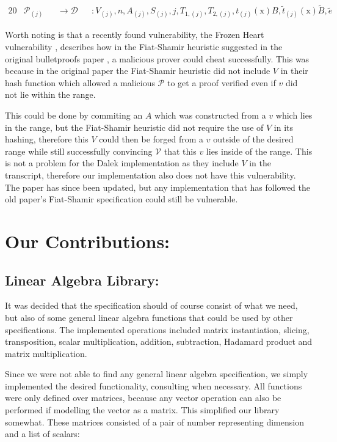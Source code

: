 \documentclass{article}
\newcommand{\eq}[1]{\begin{alignat*}{20}#1\end{alignat*}}
\newcommand{\ran}[1]{\mathrm{#1}}
\newcommand{\V}{\mathcal{V}}
\renewcommand{\P}{\mathcal{P}}
\newcommand{\D}{\mathcal{D}}
\newcommand{\blind}[1]{\widetilde{#1}}
\newcommand{\bt}{\blind{t}}
\newcommand{\bB}{\blind{B}}
\newcommand{\be}{\blind{e}}
\begin{document}
\eq{
	&\P_{(j)} &&\rightarrow \D &&: V_{(j)}, n, A_{(j)}, S_{(j)}, j, T_{1, (j)}, T_{2,(j)}, t_{(j)}(\ran{x})B, \bt_{(j)}(\ran{x})\bB, \be
}

Worth noting is that a recently found vulnerability, the Frozen
Heart vulnerability \cite{frozen-heart}, describes how in the
Fiat-Shamir heuristic suggested in the original bulletproofs paper
\cite{bulletproofs}, a malicious prover could cheat successfully. This
was because in the original paper the Fiat-Shamir heuristic did not
include $V$ in their hash function which allowed a malicious $\P$
to get a proof verified even if $v$ did not lie within the range.

This could be done by commiting an $A$ which was constructed from
a $v$ which lies in the range, but the Fiat-Shamir heuristic did
not require the use of $V$ in its hashing, therefore this $V$
could then be forged from a $v$ outside of the desired range while
still successfully convincing $\V$ that this $v$ lies inside of the
range. This is not a problem for the Dalek implementation as they
include $V$ in the transcript, therefore our implementation also
does not have this vulnerability. The paper has since been updated,
but any implementation that has followed the old paper's Fiat-Shamir
specification could still be vulnerable.

\section{Our Contributions:} \label{our-contributions}

\subsection{Linear Algebra Library:} \label{linear-algebra-library}
It was decided that the specification should of course consist of what
we need, but also of some general linear algebra functions that could
be used by other specifications. The implemented operations included
matrix instantiation, slicing, transposition, scalar multiplication,
addition, subtraction, Hadamard product and matrix multiplication.

Since we were not able to find any general linear algebra
specification, we simply implemented the desired functionality,
consulting \cite{linear-algebra} when necessary. All functions were
only defined over matrices, because any vector operation can also
be performed if modelling the vector as a matrix. This simplified
our library somewhat. These matrices consisted of a pair of number
representing dimension and a list of scalars:
\end{document}
